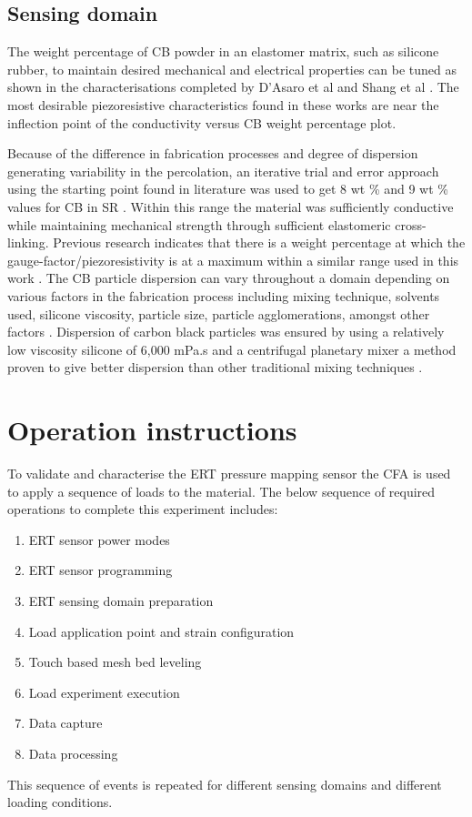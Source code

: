 \subsection{Sensing domain}
The weight percentage of CB powder in an elastomer matrix, such as silicone rubber, to maintain desired mechanical and electrical properties can be tuned as shown in the characterisations completed by D'Asaro et al and Shang et al \cite{D'Asaro2017, Shang2016}. The most desirable piezoresistive characteristics found in these works are near the inflection point of the conductivity versus CB weight percentage plot.

Because of the difference in fabrication processes and degree of dispersion generating variability in the percolation, an iterative trial and error approach using the starting point found in literature was used to get 8 wt \% and 9 wt \% values for CB in SR \cite{D'Asaro2017, Shang2016}. Within this range the material was sufficiently conductive while maintaining mechanical strength through sufficient elastomeric cross-linking. Previous research indicates that there is a weight percentage at which the gauge-factor/piezoresistivity is at a maximum within a similar range used in this work \cite{Dong2017, Yang2020}. The CB particle dispersion can vary throughout a domain depending on various factors in the fabrication process including mixing technique, solvents used, silicone viscosity, particle size, particle agglomerations, amongst other factors \cite{Kalyon2002,Rodgers2010,Lux1993,Xu2016}. Dispersion of carbon black particles was ensured by using a relatively low viscosity silicone of 6,000 mPa.s and a centrifugal planetary mixer a method proven to give better dispersion than other traditional mixing techniques \cite{Thinky2010}.


\section{Operation instructions}
To validate and characterise the ERT pressure mapping sensor the CFA is used to apply a sequence of loads to the material. The below sequence of required operations to complete this experiment includes: 
\begin{enumerate}
\item ERT sensor power modes
\item ERT sensor programming
\item ERT sensing domain preparation
\item Load application point and strain configuration
\item Touch based mesh bed leveling
\item Load experiment execution
\item Data capture
\item Data processing
\end{enumerate}
This sequence of events is repeated for different sensing domains and different loading conditions.

